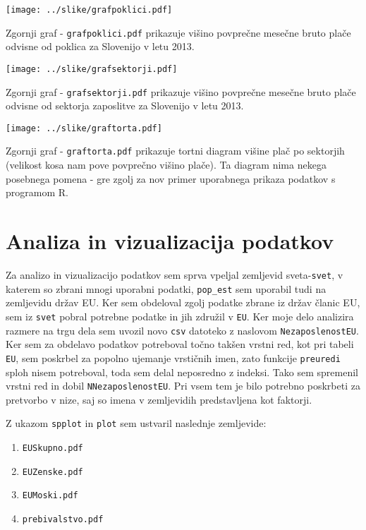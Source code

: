 \documentclass[11pt,a4paper]{article}
\begin{document}
\texttt{[image: ../slike/grafpoklici.pdf]}

Zgornji graf - \verb|grafpoklici.pdf| prikazuje višino povprečne mesečne bru\-to plače odvisne od poklica za Slovenijo v letu 2013. 

\texttt{[image: ../slike/grafsektorji.pdf]}

Zgornji graf - \verb|grafsektorji.pdf| prikazuje višino povprečne mesečne bru\-to plače odvisne od sektorja zaposlitve za Slovenijo v letu 2013. 

\texttt{[image: ../slike/graftorta.pdf]}

Zgornji graf - \verb|graftorta.pdf| prikazuje tortni diagram višine plač po sektorjih (velikost kosa nam pove povprečno višino plače). Ta diagram nima nekega posebnega pomena - gre zgolj za nov primer uporabnega prikaza podatkov s programom R. 
\pagebreak
\section{Analiza in vizualizacija podatkov}

Za analizo in vizualizacijo podatkov sem sprva vpeljal zemljevid sveta-\verb|svet|, v katerem so zbrani mnogi uporabni podatki, \verb|pop_est| sem uporabil tudi na zemljevidu držav EU. Ker sem obdeloval zgolj podatke zbrane iz držav članic EU, sem iz \verb|svet| pobral potrebne podatke in jih združil v \verb|EU|. Ker moje delo analizira razmere na trgu dela sem uvozil novo \verb|csv| datoteko z naslovom \verb|NezaposlenostEU|. Ker sem za obdelavo podatkov potreboval točno takšen vrstni red, kot pri tabeli \verb|EU|, sem poskrbel za popolno ujemanje vrstičnih imen, zato funkcije \verb|preuredi| sploh nisem potreboval, toda sem delal neposredno z indeksi. Tako sem spremenil vrstni red in dobil \verb|NNezaposlenostEU|. Pri vsem tem je bilo potrebno poskrbeti za pretvorbo v nize, saj so imena v zemljevidih predstavljena kot faktorji. 

Z ukazom \verb|spplot| in \verb|plot| sem ustvaril naslednje zemljevide: 
\begin{enumerate} 
\item{\verb|EUSkupno.pdf|}

\item{\verb|EUZenske.pdf|}

\item{\verb|EUMoski.pdf|}

\item{\verb|prebivalstvo.pdf|}
\end{enumerate}
\end{document}

